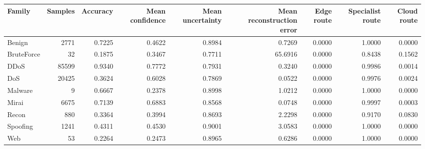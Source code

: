 \begin{tabular}{lrrrrrrrr}
\toprule
Family & Samples & Accuracy & Mean confidence & Mean uncertainty & Mean reconstruction error & Edge route & Specialist route & Cloud route \\
\midrule
Benign & 2771 & 0.7225 & 0.4622 & 0.8984 & 0.7269 & 0.0000 & 1.0000 & 0.0000 \\
BruteForce & 32 & 0.1875 & 0.3467 & 0.7711 & 65.6916 & 0.0000 & 0.8438 & 0.1562 \\
DDoS & 85599 & 0.9340 & 0.7772 & 0.7931 & 0.3240 & 0.0000 & 0.9986 & 0.0014 \\
DoS & 20425 & 0.3624 & 0.6028 & 0.7869 & 0.0522 & 0.0000 & 0.9976 & 0.0024 \\
Malware & 9 & 0.6667 & 0.2378 & 0.8998 & 1.0212 & 0.0000 & 1.0000 & 0.0000 \\
Mirai & 6675 & 0.7139 & 0.6883 & 0.8568 & 0.0748 & 0.0000 & 0.9997 & 0.0003 \\
Recon & 880 & 0.3364 & 0.3994 & 0.8693 & 2.2298 & 0.0000 & 0.9170 & 0.0830 \\
Spoofing & 1241 & 0.4311 & 0.4530 & 0.9001 & 3.0583 & 0.0000 & 1.0000 & 0.0000 \\
Web & 53 & 0.2264 & 0.2473 & 0.8965 & 0.6286 & 0.0000 & 1.0000 & 0.0000 \\
\bottomrule
\end{tabular}
